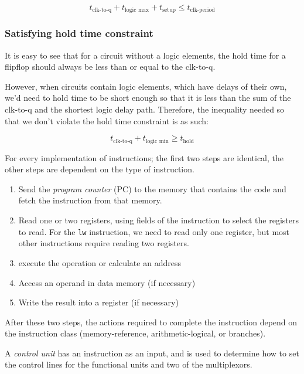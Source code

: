 \documentclass[12pt]{article}
\begin{document}
$$t_{\text{clk-to-q}} + t_{\text{logic max}} + t_{\text{setup}} \le t_{\text{clk-period}}$$

\subsubsection*{Satisfying hold time constraint}
It is easy to see that for a circuit without a logic elements, the hold time for a flipflop should always be less than or equal to the clk-to-q.

However, when circuits contain logic elements, which have delays of their own, we'd need to hold time to be short enough so that it is less than the sum of the clk-to-q and the shortest logic delay path. Therefore, the inequality needed so that we don't violate the hold time constraint is as such:

$$
    t_{\text{clk-to-q}} + t_{\text{logic min}} \ge t_{\text{hold}}
$$




For every implementation of instructions; the first two steps are identical, the other steps are dependent on the type of instruction.
\begin{enumerate}
    \item Send the \emph{program counter} (PC) to the memory that contains the code and fetch the instruction from that memory.
    \item Read one or two registers, using fields of the instruction to select the registers to read. For the \lstinline{lw} instruction, we need to read only one register, but most other instructions require reading two registers.
    \item execute the operation or calculate an address
    \item Access an operand in data memory (if necessary)
    \item Write the result into a register (if necessary)
\end{enumerate}

After these two steps, the actions required to complete the instruction depend on the instruction class (memory-reference, arithmetic-logical, or branches).

\begin{definition}
    A \emph{control unit} has an instruction as an input, and  is used to determine how to set the control lines for the functional units and two of the multiplexors.
\end{definition}
\end{document}
